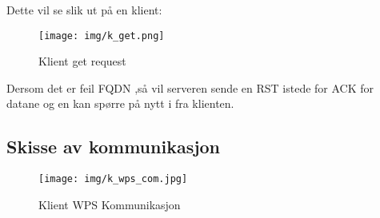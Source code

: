\documentclass[norsk,a4paper]{article}
\begin{document}
Dette vil se slik ut på en klient:
\begin{figure}[ht!]
  \texttt{[image: img/k\_get.png]}
  \caption{Klient get request}
  \label{fig:klient_get}
\end{figure}

Dersom det er feil FQDN ,så vil serveren sende en RST istede for ACK for datane og en kan spørre på nytt i fra klienten.

\subsection{Skisse av kommunikasjon}

\begin{figure}[ht!]
  \texttt{[image: img/k\_wps\_com.jpg]}
  \caption{Klient WPS Kommunikasjon}
  \label{fig:k_wps_com}
\end{figure}
\end{document}
